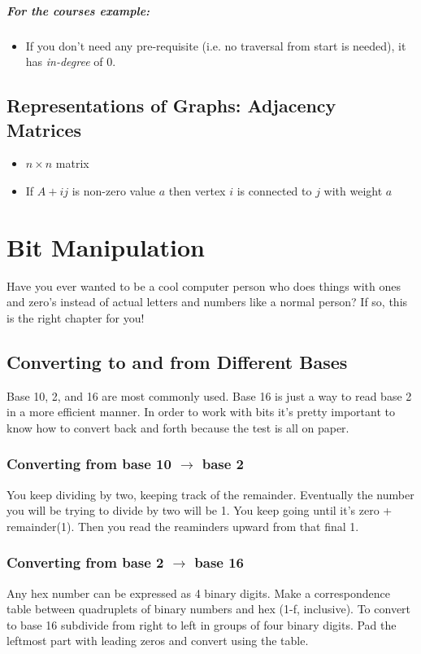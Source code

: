 \documentclass[a4paper,12pt]{report}
\begin{document}
\paragraph{For the courses example:}
\begin{itemize}
\item If you don't need any pre-requisite (i.e. no traversal from start is needed), it has \textit{in-degree} of 0.
\end{itemize}

\section{Representations of Graphs: Adjacency Matrices}
\begin{itemize}
\item $n \times n$ matrix
\item If $A+{ij}$ is non-zero value $a$ then vertex $i$ is connected to $j$ with weight $a$
\end{itemize}

\chapter{Bit Manipulation}
Have you ever wanted to be a cool computer person who does things with ones and zero's instead of actual letters and numbers like a normal person? If so, this is the right chapter for you!

\section{Converting to and from Different Bases}
Base 10, 2, and 16 are most commonly used. Base 16 is just a way to read base 2 in a more efficient manner. In order to work with bits it's pretty important to know how to convert back and forth because the test is all on paper. 

\subsection{Converting from base 10 $\to$ base 2}
You keep dividing by two, keeping track of the remainder. Eventually the number you will be trying to divide by two will be 1. You keep going until it's zero + remainder(1). Then you read the reaminders upward from that final 1.

\subsection{Converting from base 2 $\to$ base 16}
Any hex number can be expressed as 4 binary digits. Make a correspondence table between quadruplets of binary numbers and hex (1-f, inclusive). To convert to base 16 subdivide from right to left in groups of four binary digits. Pad the leftmost part with leading zeros and convert using the table. 
\end{document}
